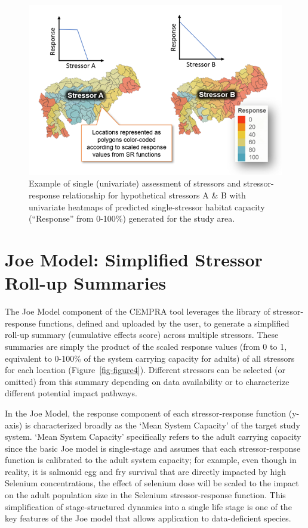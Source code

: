 \documentclass[
  letterpaper,
  DIV=11,
  numbers=noendperiod]{scrreprt}
\begin{document}
\begin{figure}

{\centering \includegraphics{images/image007.png}

}

\caption{\label{fig-figure3}Example of single (univariate) assessment of
stressors and stressor-response relationship for hypothetical stressors
A \& B with univariate heatmaps of predicted single-stressor habitat
capacity (``Response'' from 0-100\%) generated for the study area.}

\end{figure}

\hypertarget{joe-model-simplified-stressor-roll-up-summaries}{%
\section{Joe Model: Simplified Stressor Roll-up
Summaries}\label{joe-model-simplified-stressor-roll-up-summaries}}

The Joe Model component of the CEMPRA tool leverages the library of
stressor-response functions, defined and uploaded by the user, to
generate a simplified roll-up summary (cumulative effects score) across
multiple stressors. These summaries are simply the product of the scaled
response values (from 0 to 1, equivalent to 0-100\% of the system
carrying capacity for adults) of all stressors for each location
(Figure~\ref{fig-figure4}). Different stressors can be selected (or
omitted) from this summary depending on data availability or to
characterize different potential impact pathways.

In the Joe Model, the response component of each stressor-response
function (y-axis) is characterized broadly as the `Mean System Capacity'
of the target study system. `Mean System Capacity' specifically refers
to the adult carrying capacity since the basic Joe model is single-stage
and assumes that each stressor-response function is calibrated to the
adult system capacity; for example, even though in reality, it is
salmonid egg and fry survival that are directly impacted by high
Selenium concentrations, the effect of selenium dose will be scaled to
the impact on the adult population size in the Selenium
stressor-response function. This simplification of stage-structured
dynamics into a single life stage is one of the key features of the Joe
model that allows application to data-deficient species.
\end{document}
